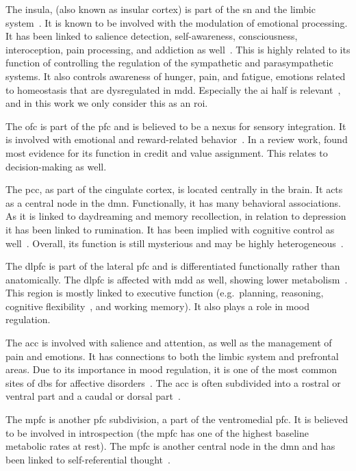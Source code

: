 The insula, (also known as insular cortex) is part of the \gls{sn} and the limbic system~\parencite{Uddin2017}.
It is known to be involved with the modulation of emotional processing.
It has been linked to salience detection, self-awareness, consciousness, interoception, pain processing, and addiction as well~\parencite{Menon2010}.
This is highly related to its function of controlling the regulation of the sympathetic and parasympathetic systems.
It also controls awareness of hunger, pain, and fatigue, emotions related to homeostasis that are dysregulated in \gls{mdd}.
Especially the \gls{ai} half is relevant~\parencite{Pasquini2020}, and in this work we only consider this as an \gls{roi}.

The \gls{ofc} is part of the \gls{pfc} and is believed to be a nexus for sensory integration.
It is involved with emotional and reward-related behavior~\parencite{Kringelbach2005}.
In a review work, \textcite{Stalnaker2015} found most evidence for its function in credit and value assignment.
This relates to decision-making as well.

The \gls{pcc}, as part of the cingulate cortex, is located centrally in the brain.
It acts as a central node in the \gls{dmn}.
Functionally, it has many behavioral associations.
As it is linked to daydreaming and memory recollection, in relation to depression it has been linked to rumination.
It has been implied with cognitive control as well~\parencite{Leech2012}.
Overall, its function is still mysterious and may be highly heterogeneous~\parencite{Leech2014}.

The \gls{dlpfc} is part of the lateral \gls{pfc} and is differentiated functionally rather than anatomically.
The \gls{dlpfc} is affected with \gls{mdd} as well, showing lower metabolism~\parencite{Pandya2012}.
This region is mostly linked to executive function (e.g.~planning, reasoning, cognitive flexibility~\parencite{Dajani2015}, and working memory).
It also plays a role in mood regulation.

The \gls{acc} is involved with salience and attention, as well as the management of pain and emotions.
It has connections to both the limbic system and prefrontal areas.
Due to its importance in mood regulation, it is one of the most common sites of \gls{dbs} for affective disorders~\parencite{Drevets2008}.
The \gls{acc} is often subdivided into a rostral or ventral part and a caudal or dorsal part~\parencite[see][for more clarification on subdivisions]{Stevens2011}.

The \gls{mpfc} is another \gls{pfc} subdivision, a part of the ventromedial \gls{pfc}.
It is believed to be involved in introspection (the \gls{mpfc} has one of the highest baseline metabolic rates at rest).
The \gls{mpfc} is another central node in the \gls{dmn} and has been linked to self-referential thought~\parencite{Gusnard2001}.

